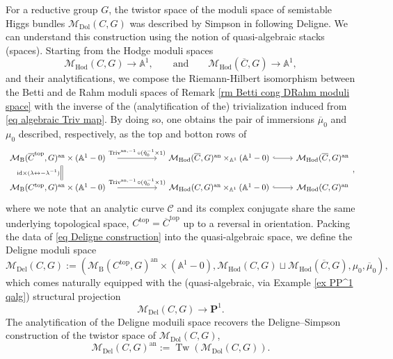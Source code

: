 \documentclass[11pt, a4paper]{amsart}
\numberwithin{equation}{section}
\theoremstyle{definition}
\theoremstyle{remark}
\DeclareMathOperator{\id}{1}
\DeclareMathOperator{\an}{an}
\DeclareMathOperator{\Tw}{Tw}
\DeclareMathOperator{\Triv}{Triv}
\DeclareMathOperator{\Dol}{Dol}
\DeclareMathOperator{\Hod}{Hod}
\DeclareMathOperator{\Del}{Del}
\renewcommand{\top}{\mathrm{top}}
\newcommand{\Cc}{\mathcal{C}}
\newcommand{\Mm}{\mathcal{M}}
\newcommand{\B}{\mathrm{B}}
\renewcommand{\P}{\mathbf{P}}
\newcommand{\ol}[1]{\overline{#1}}
\renewcommand{\AA}{\mathbb{A}}
\renewcommand{\to}{\longrightarrow}
\begin{document}
For a reductive group $G$, the twistor space of the moduli space of semistable Higgs bundles $\Mm_{\Dol}(C,G)$ was described by Simpson in \cite{simpson_hodge_2} following Deligne. We can understand this construction using the notion of quasi-algebraic stacks (spaces). Starting from the Hodge moduli spaces 
\[
\Mm_{\Hod}(C,G) \to \AA^1, \qquad \text{and} \qquad \Mm_{\Hod}(\ol C,G) \to \AA^1,
\]
and their analytifications, we compose the Riemann-Hilbert isomorphism between the Betti and de Rahm moduli spaces of Remark \ref{rm Betti cong DRahm moduli space} with the inverse of the (analytification of the) trivialization induced from \eqref{eq algebraic Triv map}. By doing so, one obtains the pair of immersions $\ol{\mu}_0$ and $\mu_0$ described, respectively, as the top and botton rows of 
\begin{equation}
\label{eq Deligne construction}
\begin{tikzcd}
\Mm_{\B}(\ol{C}^{\top},G)^{\an} \times (\AA^1 - 0) \quad
\arrow[rr, "\Triv^{\an, -1} \circ (\check{\eta}_0^{-1} \times \id )"]
& &
\quad \Mm_{\Hod}(\ol C,G)^{\an} \times_{\AA^1} (\AA^1 - 0)
\arrow[r, hook]
&
\Mm_{\Hod}(\ol C,G)^{\an}
\\
\Mm_{\B}(C^{\top},G)^{\an} \times (\AA^1 - 0) \quad
\arrow[rr, "\Triv^{\an, -1} \circ (\check{\eta}_0^{-1} \times \id )"]
\arrow[u, equal, "\mathrm{id} \times (\lambda \leftrightarrow -\lambda^{-1})"]
& &
\quad \Mm_{\Hod}(C,G)^{\an} \times_{\AA^1} (\AA^1 - 0)
\arrow[r, hook]
&
\Mm_{\Hod}(C,G)^{\an}
\end{tikzcd},
\end{equation}
where we note that an analytic curve $\Cc$ and its complex conjugate share the same underlying topological space, $C^{\top} = \ol C^{\top}$ up to a reversal in orientation. Packing the data of \eqref{eq Deligne construction} into the quasi-algebraic space, we define the Deligne moduli space
\[
\Mm_{\Del}(C,G) := \left ( \Mm_{\B}(C^{\top},G)^{\an} \times (\AA^1 - 0), \Mm_{\Hod}(C,G) \sqcup \Mm_{\Hod}(\ol C,G), \mu_0, \ol\mu_0 \right ),
\]
which comes naturally equipped with the (quasi-algebraic, via Example \ref{ex PP^1 qalg}) structural projection
\begin{equation} \label{eq structural morphism Mm_Del}
\Mm_{\Del}(C,G) \to \P^1.
\end{equation}
The analytification of the Deligne moduili space recovers the Deligne--Simpson construction of the twistor space of $\Mm_{\Dol}(C,G)$,
\begin{equation} \label{eq M_Del is tw M_Dol}
\Mm_{\Del}(C,G)^{\an} := \Tw\left ( \Mm_{\Dol}(C,G) \right).
\end{equation}
\end{document}
